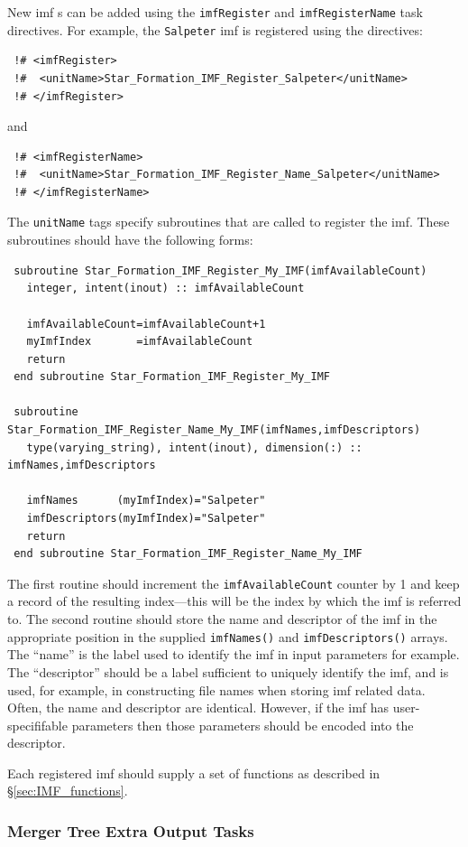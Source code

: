 New \gls{imf} s can be added using the {\tt imfRegister} and {\tt imfRegisterName} task directives. For example, the {\tt Salpeter} \gls{imf} is registered using the directives:
\begin{verbatim}
 !# <imfRegister>
 !#  <unitName>Star_Formation_IMF_Register_Salpeter</unitName>
 !# </imfRegister>
\end{verbatim}
and
\begin{verbatim}
 !# <imfRegisterName>
 !#  <unitName>Star_Formation_IMF_Register_Name_Salpeter</unitName>
 !# </imfRegisterName>
\end{verbatim}
The {\tt unitName} tags specify subroutines that are called to register the \gls{imf}. These subroutines should have the following forms:
\begin{verbatim}
 subroutine Star_Formation_IMF_Register_My_IMF(imfAvailableCount)
   integer, intent(inout) :: imfAvailableCount

   imfAvailableCount=imfAvailableCount+1
   myImfIndex       =imfAvailableCount
   return
 end subroutine Star_Formation_IMF_Register_My_IMF

 subroutine Star_Formation_IMF_Register_Name_My_IMF(imfNames,imfDescriptors)
   type(varying_string), intent(inout), dimension(:) :: imfNames,imfDescriptors

   imfNames      (myImfIndex)="Salpeter"
   imfDescriptors(myImfIndex)="Salpeter"
   return
 end subroutine Star_Formation_IMF_Register_Name_My_IMF
\end{verbatim}
The first routine should increment the {\tt imfAvailableCount} counter by 1 and keep a record of the resulting index---this will be the index by which the \gls{imf} is referred to. The second routine should store the name and descriptor of the \gls{imf} in the appropriate position in the supplied {\tt imfNames()} and {\tt imfDescriptors()} arrays. The ``name'' is the label used to identify the \gls{imf} in input parameters for example. The ``descriptor'' should be a label sufficient to uniquely identify the \gls{imf}, and is used, for example, in constructing file names when storing \gls{imf} related data. Often, the name and descriptor are identical. However, if the \gls{imf} has user-specififable parameters then those parameters should be encoded into the descriptor.

Each registered \gls{imf} should supply a set of functions as described in \S\ref{sec:IMF_functions}.

\subsubsection{Merger Tree Extra Output Tasks}

